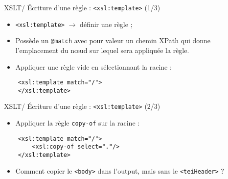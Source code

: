 \documentclass{beamer}
\begin{document}
    \begin{frame}[fragile]{XSLT/ Écriture d'une règle : \texttt{<xsl:template>} (1/3)}
        \Large
        \begin{itemize}
            \item \texttt{<xsl:template>} $\rightarrow$ définir une règle ;
            \bigskip
            \item Possède un \texttt{@match} avec pour valeur un chemin XPath qui donne l'emplacement du n\oe ud sur lequel sera appliquée la règle.
            \bigskip
            \item Appliquer une règle vide en sélectionnant la racine :
        \end{itemize}

        \begin{verbatim}
    <xsl:template match="/">
    </xsl:template>
        \end{verbatim}
    \end{frame}

    \begin{frame}[fragile]{XSLT/ Écriture d'une règle : \texttt{<xsl:template>} (2/3)}
        \Large
        \begin{itemize}
            \item Appliquer la règle \texttt{copy-of} sur la racine :
        \end{itemize}

        \begin{verbatim}
    <xsl:template match="/">
        <xsl:copy-of select="."/>
    </xsl:template>
        \end{verbatim}

        \begin{itemize}
            \item Comment copier le \texttt{<body>} dans l'output, mais sans le \texttt{<teiHeader>} ?
        \end{itemize}
    \end{frame}
\end{document}
